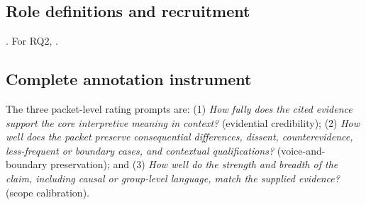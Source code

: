 \subsection{Role definitions and recruitment}
\label{sec:reviewer_protocol}
. For RQ2, .

\subsection{Complete annotation instrument}
The three packet-level rating prompts are: (1) \emph{How fully does the cited evidence support the core interpretive meaning in context?} (evidential credibility); (2) \emph{How well does the packet preserve consequential differences, dissent, counterevidence, less-frequent or boundary cases, and contextual qualifications?} (voice-and-boundary preservation); and (3) \emph{How well do the strength and breadth of the claim, including causal or group-level language, match the supplied evidence?} (scope calibration).

